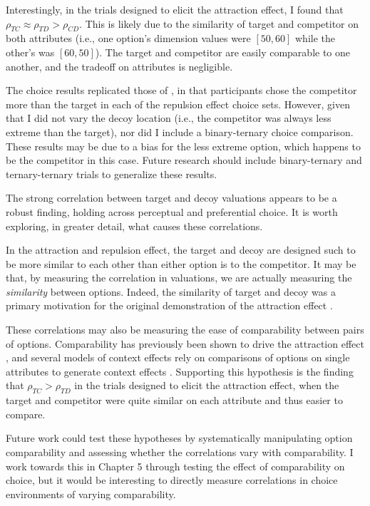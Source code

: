 Interestingly, in the trials designed to elicit the attraction effect, I found that $\rho_{TC}\approx\rho_{TD}>\rho_{CD}$. This is likely due to the similarity of target and competitor on both attributes (i.e., one option's dimension values were $[50,60]$ while the other's was $[60,50]$). The target and competitor are easily comparable to one another, and the tradeoff on attributes is negligible.

The choice results replicated those of \textcite{banerjeeFactorsThatPromote2024}, in that participants chose the competitor more than the target in each of the repulsion effect choice sets. However, given that I did not vary the decoy location (i.e., the competitor was always less extreme than the target), nor did I include a binary-ternary choice comparison. These results may be due to a bias for the less extreme option, which happens to be the competitor in this case. Future research should include binary-ternary and ternary-ternary trials to generalize these results.

The strong correlation between target and decoy valuations appears to be a robust finding, holding across perceptual and preferential choice. It is worth exploring, in greater detail, what causes these correlations. 

In the attraction and repulsion effect, the target and decoy are designed such to be more similar to each other than either option is to the competitor. It may be that, by measuring the correlation in valuations, we are actually measuring the \textit{similarity} between options. Indeed, the similarity of target and decoy was a primary motivation for the original demonstration of the attraction effect \parencite{huberAddingAsymmetricallyDominated1982d}. 

These correlations may also be measuring the ease of comparability between pairs of options. Comparability has previously been shown to drive the attraction effect \parencite{noguchi2014attraction,cataldoComparisonProcessAccount2019b}, and several models of context effects rely on comparisons of options on single attributes to generate context effects \parencite{trueblood2014multiattribute,roeMultialternativeDecisionField2001a}. Supporting this hypothesis is the finding that $\rho_{TC}>\rho_{TD}$ in the trials designed to elicit the attraction effect, when the target and competitor were quite similar on each attribute and thus easier to compare.

Future work could test these hypotheses by systematically manipulating option comparability and assessing whether the correlations vary with comparability. I work towards this in Chapter 5 through testing the effect of comparability on choice, but it would be interesting to directly measure correlations in choice environments of varying comparability. 
